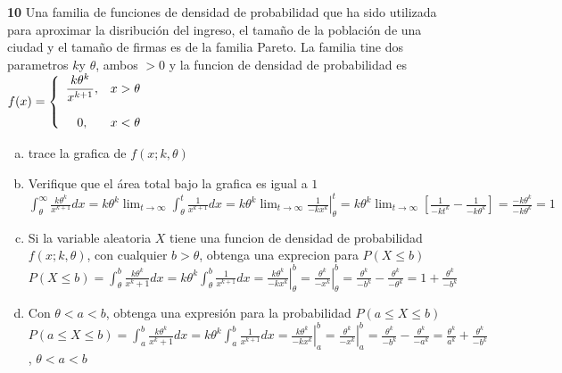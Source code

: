 \documentclass[12pt, letterpaper]{article}
\begin{document}
\textbf{10} Una familia de funciones de densidad de probabilidad que ha sido utilizada para aproximar la disribución del ingreso, el tamaño de la población de una ciudad y el tamaño de firmas es de la familia Pareto. La familia tine dos parametros $k$y $\theta$, ambos $>0$ y la funcion de densidad de probabilidad es\vskip0.1cm
$f(x)=\left\{\begin{array}{c l}
	\displaystyle\frac{k\theta^k}{x^{k+1}}, & x>\theta\\ \\
	0, & x<\theta
\end{array}\right.$
\begin{enumerate}[a)]
	\item trace la grafica de $f(x;k,\theta)$\vskip0.1cm
	\begin{center}
	\end{center}
	\item Verifique que el área total bajo la grafica es igual a $1$\vskip0.1cm
		$\displaystyle\int_\theta^\infty\frac{k\theta^k}{x^{k+1}}dx=k\theta^k\lim_{t\to \infty}\int_\theta^t\frac{1}{x^{k+1}}dx=\left.k\theta^k\lim_{t\to \infty}\frac{1}{-kx^k}\right|_\theta^t=k\theta^k\lim_{t\to \infty}\left[\frac{1}{-kt^k}-\frac{1}{-k\theta^k}\right]=\frac{-k\theta^k}{-k\theta^k}=1$
	\item Si la variable aleatoria $X$ tiene una funcion de densidad de probabilidad $f(x;k,\theta)$, con cualquier $b>\theta$, obtenga una exprecion para $P(X\leq b)$\vskip0.1cm
		$P(X\leq b)=\displaystyle\int_\theta^b\frac{k\theta^k}{x^k+1}dx=k\theta^k\int_\theta^b\frac{1}{x^{k+1}}dx=\left.\frac{k\theta^k}{-kx^k}\right|_\theta^b=\left.\frac{\theta^k}{-x^k}\right|_\theta^b=\frac{\theta^k}{-b^k}-\frac{\theta^k}{-\theta^k}=1+\frac{\theta^k}{-b^k}$
	\item Con $\theta<a<b$, obtenga una expresión para la probabilidad $P(a\leq X\leq b)$\vskip0.1cm
		$P(a\leq X\leq b)=\displaystyle\int_a^b\frac{k\theta^k}{x^k+1}dx=k\theta^k\int_a^b\frac{1}{x^{k+1}}dx=\left.\frac{k\theta^k}{-kx^k}\right|_a^b=\left.\frac{\theta^k}{-x^k}\right|_a^b=\frac{\theta^k}{-b^k}-\frac{\theta^k}{-a^k}=\frac{\theta^k}{a^k}+\frac{\theta^k}{-b^k}$, $\theta<a<b$
\end{enumerate}
\end{document}
